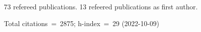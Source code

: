 73 refereed publications. 13 refeered publications as first author.

Total citations~=~2875; h-index~=~29 (2022-10-09)